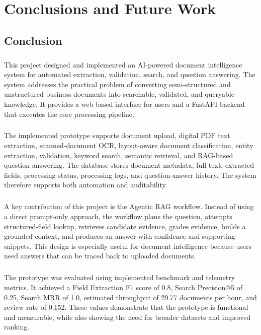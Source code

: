 \chapter{Conclusions and Future Work}
\label{chap:conclusion}

\section{Conclusion}
\paragraph{} This project designed and implemented an AI-powered document intelligence system for automated extraction, validation, search, and question answering. The system addresses the practical problem of converting semi-structured and unstructured business documents into searchable, validated, and queryable knowledge. It provides a web-based interface for users and a FastAPI backend that executes the core processing pipeline.

\paragraph{} The implemented prototype supports document upload, digital PDF text extraction, scanned-document OCR, layout-aware document classification, entity extraction, validation, keyword search, semantic retrieval, and RAG-based question answering. The database stores document metadata, full text, extracted fields, processing status, processing logs, and question-answer history. The system therefore supports both automation and auditability.

\paragraph{} A key contribution of this project is the Agentic RAG workflow. Instead of using a direct prompt-only approach, the workflow plans the question, attempts structured-field lookup, retrieves candidate evidence, grades evidence, builds a grounded context, and produces an answer with confidence and supporting snippets. This design is especially useful for document intelligence because users need answers that can be traced back to uploaded documents.

\paragraph{} The prototype was evaluated using implemented benchmark and telemetry metrics. It achieved a Field Extraction F1 score of 0.8, Search Precision@5 of 0.25, Search MRR of 1.0, estimated throughput of 29.77 documents per hour, and review rate of 0.152. These values demonstrate that the prototype is functional and measurable, while also showing the need for broader datasets and improved ranking.

